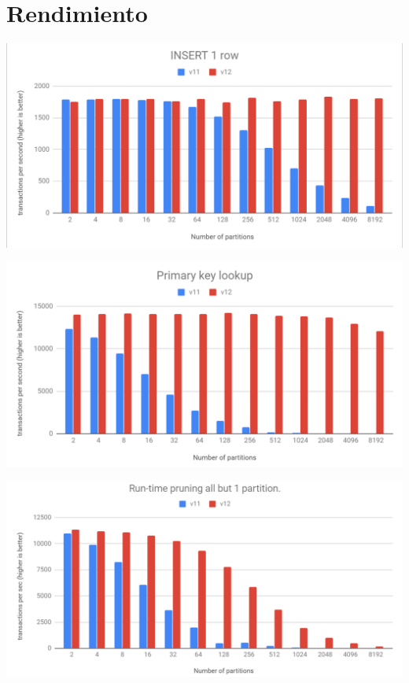 \documentclass[ignorenonframetext,t]{beamer}
\begin{document}
\section{Rendimiento}
\begin{frame}
	\center
	\includegraphics{insert-one-row.png}
\end{frame}
\begin{frame}
	\center
	\includegraphics{pk-lookup.png}
\end{frame}
\begin{frame}
	\center
	\includegraphics{runtime-prune.png}
\end{frame}
\end{document}
